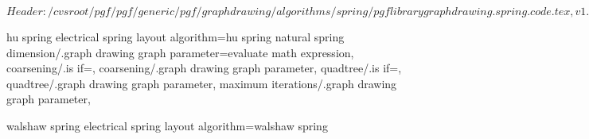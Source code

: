%
%
%

\ProvidesFileRCS[v\pgfversion] $Header: /cvsroot/pgf/pgf/generic/pgf/graphdrawing/algorithms/spring/pgflibrarygraphdrawing.spring.code.tex,v 1.1 2011/05/06 15:12:16 jannis-pohlmann Exp $







%
%



%
% 
%
\pgfgddeclarealgorithmkey
  {hu spring electrical}
  {spring layout}
  {algorithm=hu spring}
  {
    natural spring dimension/.graph drawing graph parameter=evaluate math expression,
    coarsening/.is if=,
    coarsening/.graph drawing graph parameter,
    quadtree/.is if=,
    quadtree/.graph drawing graph parameter,
    maximum iterations/.graph drawing graph parameter,
  }



%
%
%
\pgfgddeclarealgorithmkey
  {walshaw spring electrical}
  {spring layout}
  {algorithm=walshaw spring}
  {}
